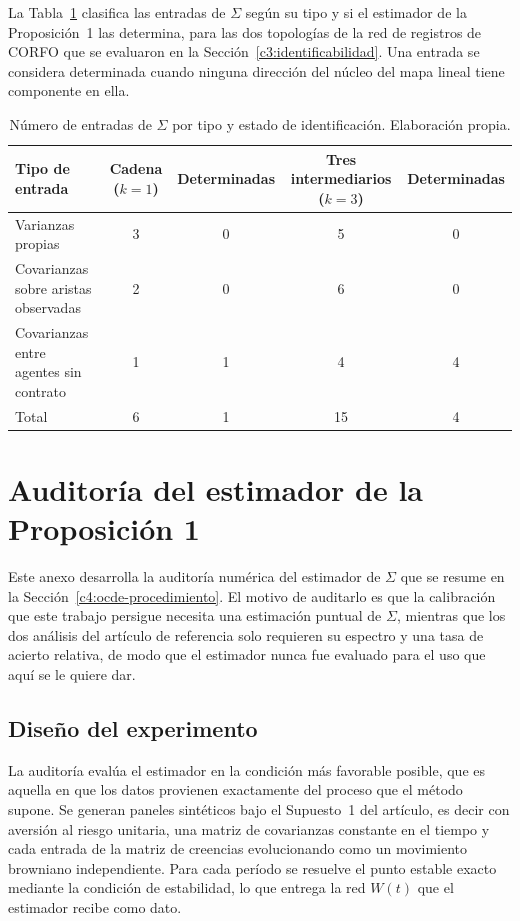 La Tabla~\ref{tab:entradas-sigma} clasifica las entradas de $\Sigma$ según su tipo y si el estimador de la Proposición~1 las determina, para las dos topologías de la red de registros de CORFO que se evaluaron en la Sección~\ref{c3:identificabilidad}. Una entrada se considera determinada cuando ninguna dirección del núcleo del mapa lineal tiene componente en ella.

\begin{table}[htbp]
\centering
\caption[Entradas de Sigma determinadas por el estimador]{Número de entradas de $\Sigma$ por tipo y estado de identificación. Elaboración propia.}
\label{tab:entradas-sigma}
\small
\begin{tabular}{lcccc}
\hline
Tipo de entrada & Cadena ($k=1$) & Determinadas & Tres intermediarios ($k=3$) & Determinadas \\
\hline
Varianzas propias                        & 3 & 0 & 5 & 0 \\
Covarianzas sobre aristas observadas     & 2 & 0 & 6 & 0 \\
Covarianzas entre agentes sin contrato   & 1 & 1 & 4 & 4 \\
\hline
Total                                    & 6 & 1 & 15 & 4 \\
\hline
\end{tabular}
\end{table}

\section{Auditoría del estimador de la Proposición 1}
\label{anexo:auditoria}

Este anexo desarrolla la auditoría numérica del estimador de $\Sigma$ que se
resume en la Sección~\ref{c4:ocde-procedimiento}. El motivo de auditarlo es que
la calibración que este trabajo persigue necesita una estimación puntual de
$\Sigma$, mientras que los dos análisis del artículo de referencia solo
requieren su espectro y una tasa de acierto relativa, de modo que el estimador
nunca fue evaluado para el uso que aquí se le quiere dar.

\subsection{Diseño del experimento}
\label{anexo:auditoria-diseno}

La auditoría evalúa el estimador en la condición más favorable posible, que es
aquella en que los datos provienen exactamente del proceso que el método supone.
Se generan paneles sintéticos bajo el Supuesto~1 del artículo, es decir con
aversión al riesgo unitaria, una matriz de covarianzas constante en el tiempo y
cada entrada de la matriz de creencias evolucionando como un movimiento
browniano independiente. Para cada período se resuelve el punto estable exacto
mediante la condición de estabilidad, lo que entrega la red $W(t)$ que el
estimador recibe como dato.

